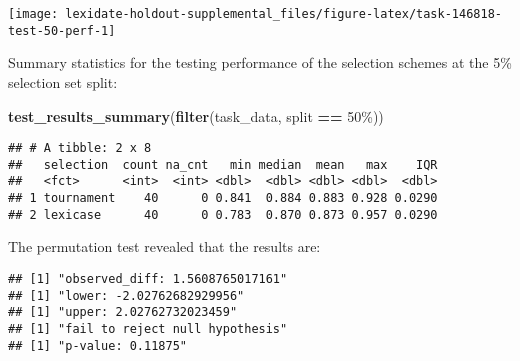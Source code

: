 \documentclass[
]{book}
\newenvironment{Shaded}{\begin{snugshade}}{\end{snugshade}}
\newcommand{\AttributeTok}[1]{\textcolor[rgb]{0.13,0.29,0.53}{#1}}
\newcommand{\DecValTok}[1]{\textcolor[rgb]{0.00,0.00,0.81}{#1}}
\newcommand{\FunctionTok}[1]{\textcolor[rgb]{0.13,0.29,0.53}{\textbf{#1}}}
\newcommand{\NormalTok}[1]{#1}
\newcommand{\OtherTok}[1]{\textcolor[rgb]{0.56,0.35,0.01}{#1}}
\newcommand{\SpecialCharTok}[1]{\textcolor[rgb]{0.81,0.36,0.00}{\textbf{#1}}}
\newcommand{\StringTok}[1]{\textcolor[rgb]{0.31,0.60,0.02}{#1}}
\begin{document}
\texttt{[image: lexidate-holdout-supplemental\_files/figure-latex/task-146818-test-50-perf-1]}

Summary statistics for the testing performance of the selection schemes at the 5\% selection set split:

\begin{Shaded}
\begin{Highlighting}[]
\FunctionTok{test\_results\_summary}\NormalTok{(}\FunctionTok{filter}\NormalTok{(task\_data, split }\SpecialCharTok{==} \StringTok{\textquotesingle{}50\%\textquotesingle{}}\NormalTok{))}
\end{Highlighting}
\end{Shaded}

\begin{verbatim}
## # A tibble: 2 x 8
##   selection  count na_cnt   min median  mean   max    IQR
##   <fct>      <int>  <int> <dbl>  <dbl> <dbl> <dbl>  <dbl>
## 1 tournament    40      0 0.841  0.884 0.883 0.928 0.0290
## 2 lexicase      40      0 0.783  0.870 0.873 0.957 0.0290
\end{verbatim}

The permutation test revealed that the results are:

\begin{Shaded}
\end{Shaded}

\begin{verbatim}
## [1] "observed_diff: 1.5608765017161"
## [1] "lower: -2.02762682929956"
## [1] "upper: 2.02762732023459"
## [1] "fail to reject null hypothesis"
## [1] "p-value: 0.11875"
\end{verbatim}
\end{document}
